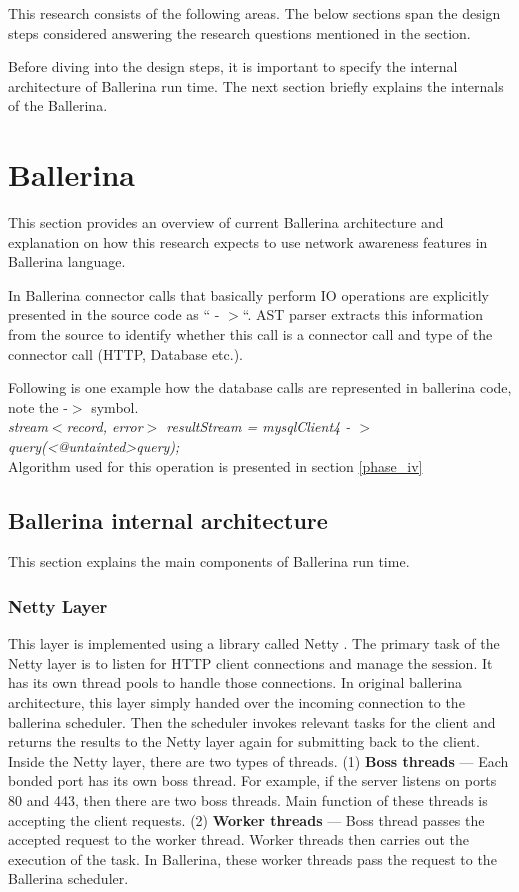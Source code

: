 This research consists of the following areas. The below sections span the design steps considered answering the research questions mentioned in the section.

Before diving into the design steps, it is important to specify the internal architecture of Ballerina run time. The next section briefly explains the internals of the Ballerina.



\section{Ballerina}\label{Sec_Ballerina}

This section provides an overview of current Ballerina architecture and explanation on how this research expects to use network awareness features in Ballerina language.  

In Ballerina connector calls that basically perform IO operations are explicitly presented in the source code as “ - $>$“. \acrfull{AST} parser extracts this information from the source to identify whether this call is a connector call and type of the connector call (HTTP, Database etc.).

Following is one example how the database calls are represented in ballerina code, note the -$>$ symbol.\\

\textit{stream$<$record{}, error$>$ resultStream = mysqlClient4 - $>$ query(<@untainted>query);}\\

Algorithm used for this operation is presented in section \ref{phase_iv}


\subsection{Ballerina internal architecture}

This section explains the main components of Ballerina run time.

\subsubsection{Netty Layer}

This layer is implemented using a library called Netty \cite{netty}. The primary task of the Netty layer is to listen for HTTP client connections and manage the session. It has its own thread pools to handle those connections. In original ballerina architecture, this layer simply handed over the incoming connection to the ballerina scheduler. Then the scheduler invokes relevant tasks for the client and returns the results to the Netty layer again for submitting back to the client. Inside the Netty layer, there are two types of threads. (1) \textbf{Boss threads} — Each bonded port has its own boss thread. For example, if the server listens on ports 80 and 443, then there are two boss threads. Main function of these threads is accepting the client requests. (2) \textbf{Worker threads} — Boss thread passes the accepted request to the worker thread. Worker threads then carries out the execution of the task. In Ballerina, these worker threads pass the request to the Ballerina scheduler.

